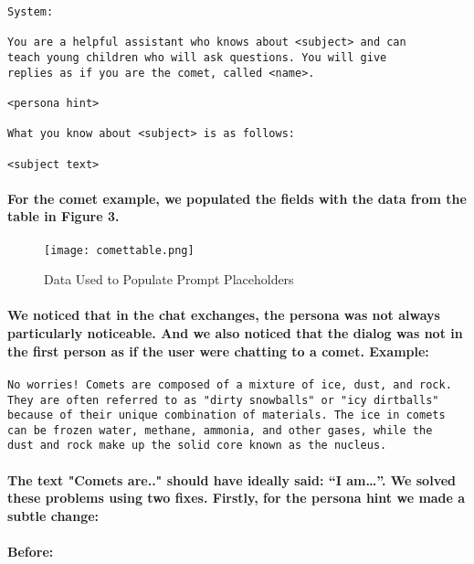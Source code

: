 \documentclass{article}
\begin{document}
\begin{verbatim}
System:

You are a helpful assistant who knows about <subject> and can
teach young children who will ask questions. You will give
replies as if you are the comet, called <name>.

<persona hint>

What you know about <subject> is as follows:

<subject text>
\end{verbatim}

\paragraph{For the comet example, we populated the fields with the data from the table in Figure 3.}

\begin{figure}[htbp]
    \centering
    \texttt{[image: comettable.png]}
    \caption{Data Used to Populate Prompt Placeholders}
    \label{fig:Table1}
\end{figure}


\paragraph{We noticed that in the chat exchanges, the persona was not always particularly noticeable. And we also noticed that the dialog was not in the first person as if the user were chatting to a comet. Example:}

\begin{verbatim}
No worries! Comets are composed of a mixture of ice, dust, and rock.
They are often referred to as "dirty snowballs" or "icy dirtballs"
because of their unique combination of materials. The ice in comets
can be frozen water, methane, ammonia, and other gases, while the
dust and rock make up the solid core known as the nucleus.
\end{verbatim}

\paragraph{The text "Comets are.." should have ideally said: “I am…”. We solved these problems using two fixes. Firstly, for the persona hint we made a subtle change:}

\paragraph{Before:}
\end{document}
